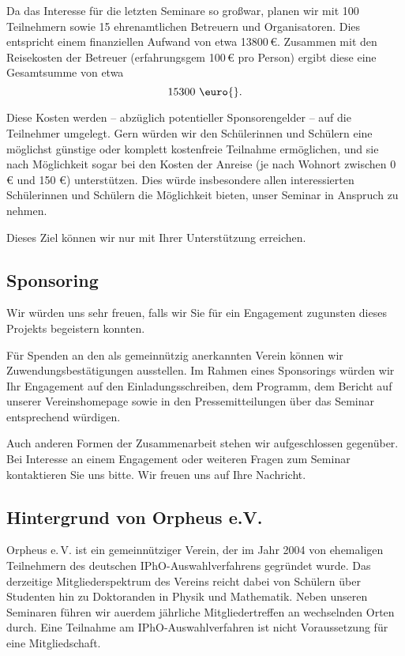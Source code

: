 \documentclass[DIV13,11pt,a4paper,headinclude]{scrartcl}
\begin{document}
Da das Interesse f\"ur die letzten Seminare so gro\ss war, planen wir mit 100 Teilnehmern sowie 15
ehrenamtlichen Betreuern und Organisatoren. Dies entspricht einem finanziellen Aufwand von etwa 13800\,\euro{}. Zusammen mit den Reisekosten der Betreuer (erfahrungsgem 100\,\euro{} pro Person) ergibt diese eine Gesamtsumme von etwa
\begin{displaymath}
\textrm{15300 \euro{}.}
\end{displaymath}

Diese Kosten werden -- abz\"uglich potentieller Sponsorengelder -- auf die
Teilnehmer umgelegt. Gern w\"urden wir den Sch\"ulerinnen und Sch\"ulern eine
m\"oglichst g\"unstige oder komplett kostenfreie Teilnahme erm\"oglichen, und sie
nach M\"oglichkeit sogar bei den Kosten der Anreise (je nach Wohnort zwischen 0
\euro{} und 150 \euro{}) unterst\"utzen. Dies w\"urde insbesondere allen
interessierten Sch\"ulerinnen und Sch\"ulern die M\"oglichkeit bieten, unser Seminar
in Anspruch zu nehmen.

Dieses Ziel k\"onnen wir nur mit Ihrer Unterst\"utzung erreichen.

\subsection*{Sponsoring}

Wir w\"urden uns sehr freuen, falls wir Sie f\"ur ein Engagement zugunsten dieses
Projekts begeistern konnten.

F\"ur Spenden an den als gemeinn\"utzig anerkannten Verein k\"onnen wir
Zuwendungsbest\"atigungen ausstellen. Im Rahmen eines Sponsorings w\"urden wir Ihr
Engagement auf den Einladungsschreiben, dem Programm, dem Bericht auf unserer
Vereinshomepage sowie in den Pressemitteilungen \"uber das Seminar entsprechend
w\"urdigen.

Auch anderen Formen der Zusammenarbeit stehen wir aufgeschlossen gegen\"uber. Bei
Interesse an einem Engagement oder weiteren Fragen zum Seminar kontaktieren Sie
uns bitte. Wir freuen uns auf Ihre Nachricht.

\subsection*{Hintergrund von Orpheus e.V.}

Orpheus e.\,V. ist ein gemeinn\"utziger Verein, der im Jahr 2004 von ehemaligen
Teilnehmern des deutschen IPhO-Auswahlverfahrens gegr\"undet wurde. Das
derzeitige Mitgliederspektrum des Vereins reicht dabei von Sch\"ulern \"uber
Studenten hin zu Doktoranden in Physik und Mathematik. Neben unseren Seminaren
f\"uhren wir auerdem j\"ahrliche Mitgliedertreffen an wechselnden Orten durch.
Eine Teilnahme am IPhO-Auswahlverfahren ist nicht Voraussetzung f\"ur eine
Mitgliedschaft.
\end{document}
